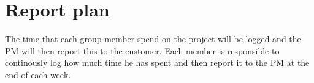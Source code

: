 \section{Report plan}
The time that each group member spend on the project will be logged and the PM will then report this to the customer. Each member is responsible to continously log how much time he has spent and then report it to the PM at the end of each week.
